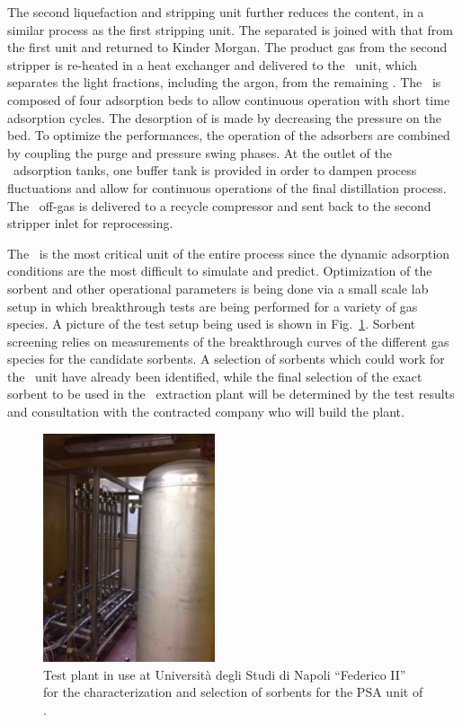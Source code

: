 The second liquefaction and stripping unit further reduces the  content, in a similar process as the first stripping unit. The separated  is joined with that from the first unit and returned to Kinder Morgan.  The product gas from the second stripper is re-heated in a heat exchanger and delivered to the \PSA\ unit, which separates the light fractions, including the argon, from the remaining .   The \PSA\ is composed of four adsorption beds to allow continuous operation with short time adsorption cycles.  The desorption of  is made by decreasing the pressure on the bed.  To optimize the performances, the operation of the adsorbers are combined by coupling the purge and pressure swing phases.  At the outlet of the \PSA\ adsorption tanks, one buffer tank is provided in order to dampen process fluctuations and allow for continuous operations of the final distillation process.  The \PSA\ off-gas is delivered to a recycle compressor and sent back to the second  stripper inlet for reprocessing.  

The \PSA\ is the most critical unit of the entire process since the dynamic adsorption conditions are the most difficult to simulate and predict.  Optimization of the sorbent and other operational parameters is being done via a small scale lab setup in which breakthrough tests are being performed for a variety of gas species.  A picture of the test setup being used is shown in Fig.~\ref{fig:Urania-PSATestPlant}.  Sorbent screening relies on measurements of the breakthrough curves of the different gas species for the candidate sorbents.  A selection of sorbents which could work for the \PSA\ unit have already been identified, while the final selection of the exact sorbent to be used in the \UAr\ extraction plant will be determined by the test results and consultation with the contracted company who will build the plant.

\begin{figure}[!t]
\centering
\includegraphics[width=0.45\textwidth]{./Figures/Urania-PSATestPlant.jpg}
\caption[Screening test plant for the \Urania\ PSA sorbent]{Test plant in use at Universit\`a degli Studi di Napoli ``Federico II'' for the characterization and selection of sorbents for the PSA unit of \Urania.}
\label{fig:Urania-PSATestPlant}
\end{figure}

